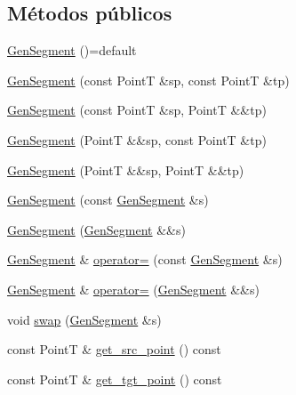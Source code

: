 \subsection*{Métodos públicos}
\begin{DoxyCompactItemize}
\item 
\hyperlink{class_designar_1_1_gen_segment_ab57969fe5adbc572d437709946c0999d}{Gen\+Segment} ()=default
\item 
\hyperlink{class_designar_1_1_gen_segment_a3735dbb7660ebba6d82a977eaee42ed8}{Gen\+Segment} (const PointT \&sp, const PointT \&tp)
\item 
\hyperlink{class_designar_1_1_gen_segment_a504a48917f78ebaae01c2a1a598d1700}{Gen\+Segment} (const PointT \&sp, PointT \&\&tp)
\item 
\hyperlink{class_designar_1_1_gen_segment_a6190cba1e40d5d18dc1853368da957dc}{Gen\+Segment} (PointT \&\&sp, const PointT \&tp)
\item 
\hyperlink{class_designar_1_1_gen_segment_a23414f22da354141bd2b8084ec178556}{Gen\+Segment} (PointT \&\&sp, PointT \&\&tp)
\item 
\hyperlink{class_designar_1_1_gen_segment_a9e40cf0ac50d71260609e0414f55f580}{Gen\+Segment} (const \hyperlink{class_designar_1_1_gen_segment}{Gen\+Segment} \&s)
\item 
\hyperlink{class_designar_1_1_gen_segment_a32578eb470796720847b126b378affed}{Gen\+Segment} (\hyperlink{class_designar_1_1_gen_segment}{Gen\+Segment} \&\&s)
\item 
\hyperlink{class_designar_1_1_gen_segment}{Gen\+Segment} \& \hyperlink{class_designar_1_1_gen_segment_a05ecd015b8b917ea85971069d999b7a7}{operator=} (const \hyperlink{class_designar_1_1_gen_segment}{Gen\+Segment} \&s)
\item 
\hyperlink{class_designar_1_1_gen_segment}{Gen\+Segment} \& \hyperlink{class_designar_1_1_gen_segment_a8a49c8cbca57eff43564bfe71f869485}{operator=} (\hyperlink{class_designar_1_1_gen_segment}{Gen\+Segment} \&\&s)
\item 
void \hyperlink{class_designar_1_1_gen_segment_ac597d1811abeb7c572dfd81363c0d120}{swap} (\hyperlink{class_designar_1_1_gen_segment}{Gen\+Segment} \&s)
\item 
const PointT \& \hyperlink{class_designar_1_1_gen_segment_a6366ec701132bf900b1211576ef5f0dd}{get\+\_\+src\+\_\+point} () const
\item 
const PointT \& \hyperlink{class_designar_1_1_gen_segment_a90e9ef8bf940d22202814a1ba3d118f2}{get\+\_\+tgt\+\_\+point} () const
\item 

\end{DoxyCompactItemize}

